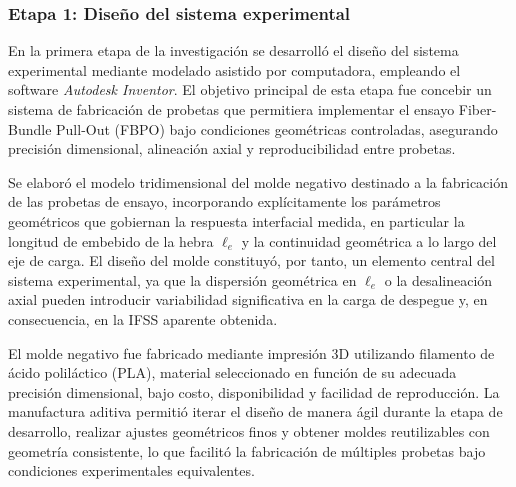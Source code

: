 

\subsubsection{Etapa 1: Diseño del sistema experimental}

En la primera etapa de la investigación se desarrolló el diseño del sistema experimental
mediante modelado asistido por computadora, empleando el software \textit{Autodesk Inventor}.
El objetivo principal de esta etapa fue concebir un sistema de fabricación de probetas que
permitiera implementar el ensayo Fiber-Bundle Pull-Out (FBPO) bajo condiciones geométricas
controladas, asegurando precisión dimensional, alineación axial y reproducibilidad entre
probetas.

Se elaboró el modelo tridimensional del molde negativo destinado a la fabricación de las
probetas de ensayo, incorporando explícitamente los parámetros geométricos que gobiernan la
respuesta interfacial medida, en particular la longitud de embebido de la hebra \(\ell_e\) y
la continuidad geométrica a lo largo del eje de carga. El diseño del molde constituyó, por
tanto, un elemento central del sistema experimental, ya que la dispersión geométrica en
\(\ell_e\) o la desalineación axial pueden introducir variabilidad significativa en la carga
de despegue y, en consecuencia, en la IFSS aparente obtenida.

El molde negativo fue fabricado mediante impresión 3D utilizando filamento de ácido
poliláctico (PLA), material seleccionado en función de su adecuada precisión dimensional,
bajo costo, disponibilidad y facilidad de reproducción. La manufactura aditiva permitió
iterar el diseño de manera ágil durante la etapa de desarrollo, realizar ajustes geométricos
finos y obtener moldes reutilizables con geometría consistente, lo que facilitó la
fabricación de múltiples probetas bajo condiciones experimentales equivalentes.

